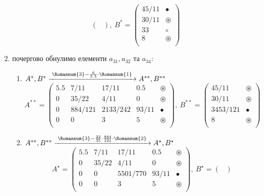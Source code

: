 \documentclass[a4paper,14pt]{extarticle} %
\begin{document}
\begin{enumerate}[Крок 1:]
\[\begin{pmatrix}
        \end{pmatrix},\
        B^* = 
        \begin{pmatrix}
            45/11 & \bullet \\
            30/11 & \circledast \\
            33 & \circ \\
            8 & \circledast \\
        \end{pmatrix}
    \]
    \item почергово обнулимо елементи $a_{31}, a_{32}$ та $a_{34}$:
    \begin{enumerate} 
        \item $ A^*,B^* \xrightarrow[]{\text{ \Romannum{3}}-\frac{6}{5.5}\cdot\text{\Romannum{1} }} A^{**},B^{**} $
        \[ A^{**} =
            \begin{pmatrix}
                5.5 & 7/11 & 17/11 & 0.5 & \circledast \\
                0 & 35/22 & 4/11 & 0 & \circledast \\
                0 & 884/121 & 2133/242 & 93/11 & \bullet \\
                0 & 0 & 3 & 5 & \circledast \\
            \end{pmatrix},\
            B^{**} = 
            \begin{pmatrix}
                45/11 & \circledast \\
                30/11 & \circledast \\
                3453/121 & \bullet \\
                8 & \circledast \\
            \end{pmatrix}
        \]
        \item $ A^{**},B^{**} \xrightarrow[]{\text{ \Romannum{3}}-\frac{22}{35}\cdot\frac{884}{121}\cdot\text{\Romannum{2} }} A^{\star},B^{\star} $
        \[ A^{\star} =
            \begin{pmatrix}
                5.5 & 7/11 & 17/11 & 0.5 & \circledast \\
                0 & 35/22 & 4/11 & 0 & \circledast \\
                0 & 0 & 5501/770 & 93/11 & \bullet \\
                0 & 0 & 3 & 5 & \circledast \\
            \end{pmatrix},\
            B^{\star} = 
            \begin{pmatrix}

\end{pmatrix}\]
\end{enumerate}
\end{enumerate}
\end{document}
